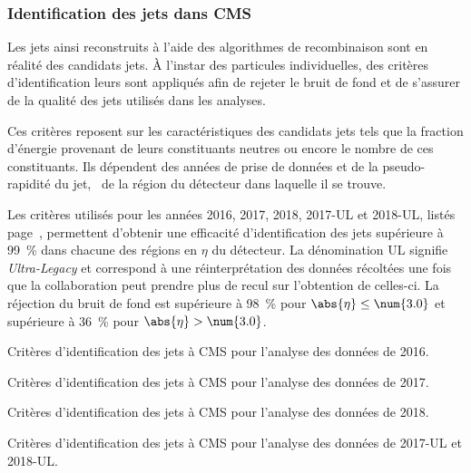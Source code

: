 \subsubsection{Identification des jets dans CMS}\label{chapter-CMS-section-jets_reco-subsec-jetID}
Les jets ainsi reconstruits à l'aide des algorithmes de recombinaison sont en réalité des \og candidats \fg{} jets.
À l'instar des particules individuelles, des critères d'identification leurs sont appliqués afin de rejeter le bruit de fond et de s'assurer de la qualité des jets utilisés dans les analyses.
\par
Ces critères reposent sur les caractéristiques des candidats jets tels que la fraction d'énergie provenant de leurs constituants neutres ou encore le nombre de ces constituants.
Ils dépendent des années de prise de données et de la pseudo-rapidité du jet, \ie\ de la région du détecteur dans laquelle il se trouve.
\par Les critères utilisés pour les années 2016, 2017, 2018, 2017-UL et 2018-UL, listés page~\pageref{tab-chapter-CMS-section-jets_reco-subsec-jetID-2017UL}, permettent d'obtenir une efficacité d'identification des jets supérieure à \SI{99}{\%} dans chacune des régions en $\eta$ du détecteur.
La dénomination \og UL \fg{} signifie \emph{Ultra-Legacy} et correspond à une réinterprétation des données récoltées une fois que la collaboration peut prendre plus de recul sur l'obtention de celles-ci.
La réjection du bruit de fond est supérieure à \SI{98}{\%} pour $\abs{\eta}\leq\num{3.0}$ et supérieure à \SI{36}{\%} pour $\abs{\eta}>\num{3.0}$.
\begin{table}[p]
\centering

\caption[Critères d'identification des jets pour l'année 2016.]{Critères d'identification des jets à CMS pour l'analyse des données de 2016.}
\label{tab-chapter-CMS-section-jets_reco-subsec-jetID-2016}
\end{table}
\begin{table}[p]
\centering

\caption[Critères d'identification des jets pour l'année 2017.]{Critères d'identification des jets à CMS pour l'analyse des données de 2017.}
\label{tab-chapter-CMS-section-jets_reco-subsec-jetID-2017}
\end{table}
\begin{table}[p]
\centering

\caption[Critères d'identification des jets pour l'année 2018.]{Critères d'identification des jets à CMS pour l'analyse des données de 2018.}
\label{tab-chapter-CMS-section-jets_reco-subsec-jetID-2018}
\end{table}
\begin{table}[p]
\centering

\caption[Critères d'identification des jets pour les années 2017-UL et 2018-UL.]{Critères d'identification des jets à CMS pour l'analyse des données de 2017-UL et 2018-UL.}
\label{tab-chapter-CMS-section-jets_reco-subsec-jetID-2017UL}
\end{table}
